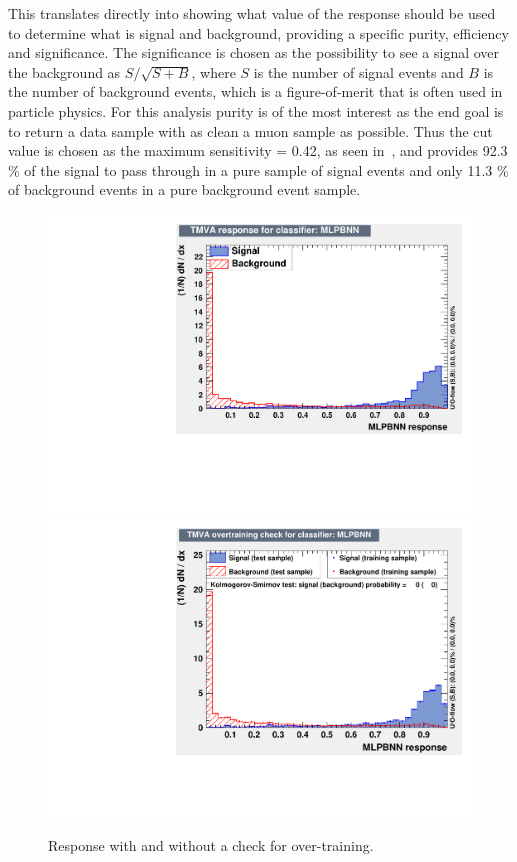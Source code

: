 This translates directly into  showing what value of the response should be used to determine what is signal and background, providing a specific purity, efficiency and significance. The significance is chosen as the possibility to see a signal over the background as $S/\sqrt{S+B}$, where $S$ is the number of signal events and $B$ is the number of background events, which is a figure-of-merit that is often used in particle physics. For this analysis purity is of the most interest as the end goal is to return a data sample with as clean a muon sample as possible. Thus the cut value is chosen as the maximum sensitivity = 0.42, as seen in~, and provides 92.3 \% of the signal to pass through in a pure sample of signal events and only 11.3 \% of background events in a pure background event sample.

\begin{figure}[h!]
\centering
\includegraphics[width=.5\textwidth]{figures/TMVA/responceTest.pdf}
\includegraphics[width=.48\textwidth]{figures/TMVA/responceTestOT.pdf}
\caption{Response with and without a check for over-training.}
\label{fig:TMVAresponce}
\end{figure}

